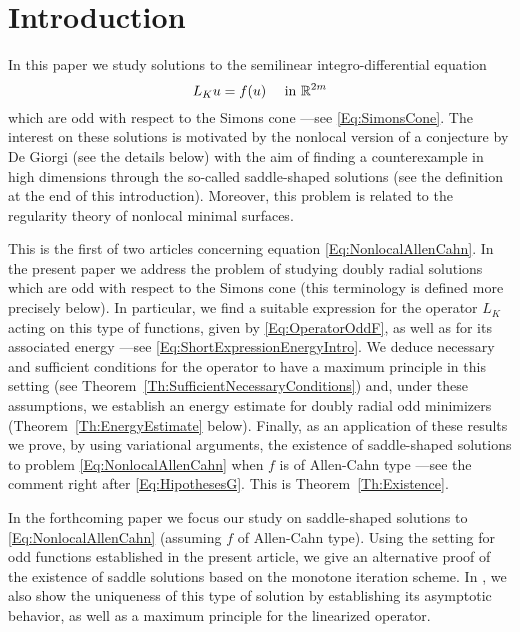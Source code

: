 \section{Introduction}
\label{Sec:Introduction}


In this paper we study solutions to the semilinear integro-differential equation
\begin{equation}
\label{Eq:NonlocalAllenCahn}
L_K u = f(u) \quad \textrm{ in } \mathbb{R}^{2m}
\end{equation}
which are odd with respect to the Simons cone ---see \eqref{Eq:SimonsCone}. The interest on these solutions is motivated by the nonlocal version of a conjecture by De Giorgi (see the details below) with the aim of finding a counterexample in high dimensions through the so-called saddle-shaped solutions (see the definition at the end of this introduction). Moreover, this problem is related to the regularity theory of nonlocal minimal surfaces.

This is the first of two articles concerning equation \eqref{Eq:NonlocalAllenCahn}. In the present paper we address the problem of studying doubly radial solutions which are odd with respect to the Simons cone (this terminology is  defined more precisely below). In particular, we find a suitable expression for the operator $L_K$  acting on this type of functions, given by \eqref{Eq:OperatorOddF}, as well as for its associated energy ---see \eqref{Eq:ShortExpressionEnergyIntro}. We deduce necessary and sufficient conditions for the operator to have a maximum principle in this setting (see Theorem~\ref{Th:SufficientNecessaryConditions}) and, under these assumptions, we establish an energy estimate for doubly radial odd minimizers (Theorem~\ref{Th:EnergyEstimate} below). Finally, as an application of these results we prove, by using variational arguments, the existence of saddle-shaped solutions to problem \eqref{Eq:NonlocalAllenCahn} when $f$ is of Allen-Cahn type ---see the comment right after \eqref{Eq:HipothesesG}. This is Theorem~\ref{Th:Existence}.

In the forthcoming paper \cite{FelipeSanz-Perela:IntegroDifferentialII} we focus our study on saddle-shaped solutions to \eqref{Eq:NonlocalAllenCahn} (assuming $f$ of Allen-Cahn type). Using the setting for odd functions established in the present article, we give an alternative proof of the existence of saddle solutions based on the monotone iteration scheme. In \cite{FelipeSanz-Perela:IntegroDifferentialII}, we also show the uniqueness of this type of solution by establishing its asymptotic behavior, as well as a maximum principle for the linearized operator.


